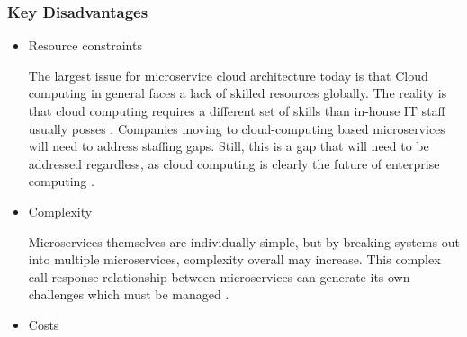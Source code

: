 \begin{frame}
  \frametitle{Key Disadvantages}
  \begin{itemize}
    \item<1-> Resource constraints

           {\scriptsize{The largest issue for microservice cloud architecture today is that Cloud computing in general faces a lack of skilled resources globally. The reality is that cloud computing requires a different set of skills than in-house IT staff usually posses \parencite{marquisImpactCloudComputing}. Companies moving to cloud-computing based microservices will need to address staffing gaps. Still, this is a gap that will need to be addressed regardless, as cloud computing is clearly the future of enterprise computing \parencite{gartnerGartnerForecastsWorldwide}.}}

    \item<2->  Complexity

           {\scriptsize{Microservices themselves are individually simple, but by breaking systems out into multiple microservices, complexity overall may increase. This complex call-response relationship between microservices can generate its own challenges which must be managed \parencite{giovannitoffettiArchitectureSelfmanagingMicroservices2015,kangContainerMicroserviceDriven2016}.}}

    \item<3-> Costs


  \end{itemize}
\end{frame}
